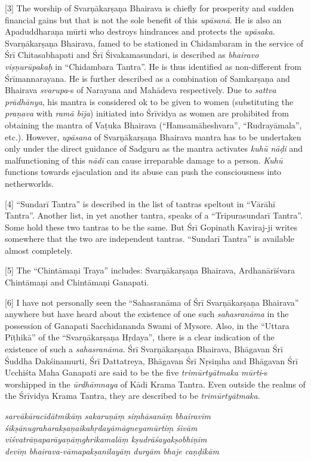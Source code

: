 \documentclass[11pt,oneside,a4paper]{article}
\newenvironment{shloka}[1]
  {\bigskip\center#1\varwidth{\linewidth}}
  {\endvarwidth\endcenter\bigskip}
\newcommand{\tl}[1]{\emph{#1}}
\begin{document}
[3] The worship of Svarṇākarṣaṇa Bhairava is chiefly for prosperity and sudden
financial gains but that is not the sole benefit of this \tl{upāsanā}. He is
also an Apaduddharaṇa mūrti who destroys hindrances and protects the \tl{upāsaka}.
Svarṇākarṣaṇa Bhairava, famed to be stationed in Chidambaram in the service
of Śrī Chitasabhapati and Śrī Śivakamasundari, is described as \tl{bhairavo
viṣṇurūpakaḥ} in ``Chidambara Tantra''. He is thus identified as non-different
from Śrīmannarayana. He is further described as a combination of Samkarṣaṇa
and Bhairava \tl{svarupa}-s of Narayana and Mahādeva respectively. Due to
\tl{sattva prādhānya}, his mantra is considered ok to be given to women
(substituting the \tl{praṇava} with \tl{ramā bīja}) initiated into Śrīvidya
as women are prohibited from obtaining the mantra of Vaṭuka Bhairava
(``Hamsamāheshvara'', ``Rudrayāmala'', etc.). However, \tl{upāsana} of
Svarṇākarṣaṇa Bhairava mantra has to be undertaken only under the direct
guidance of Sadguru as the mantra activates \tl{kuhū nāḍi} and malfunctioning
of this \tl{nādī} can cause irreparable damage to a person. \tl{Kuhū} functions
towards ejaculation and its abuse can push the consciousness into netherworlds.

[4] ``Sundarī Tantra'' is described in the list of tantras speltout in ``Vārāhī
Tantra''. Another list, in yet another tantra, speaks of a ``Tripurasundarī
Tantra''. Some hold these two tantras to be the same. But Śrī Gopinath
Kaviraj-ji writes somewhere that the two are independent tantras. ``Sundarī
Tantra'' is available almost completely.

[5] The ``Chintāmaṇi Traya'' includes: Svarṇākarṣaṇa Bhairava, Ardhanārīśvara
Chintāmaṇi and Chintāmaṇi Ganapati.

[6] I have not personally seen the ``Sahasranāma of Śrī Svarṇākarṣaṇa Bhairava''
anywhere but have heard about the existence of one such \tl{sahasranāma} in
the possession of Ganapati Sacchidananda Swami of Mysore. Also, in the ``Uttara
Pīṭhikā'' of the ``Svarṇākarṣaṇa Hṛdaya'', there is a clear indication of
the existence of such a \tl{sahasranāma}. Śrī Svarṇākarṣaṇa Bhairava, Bhāgavan
Śrī Śuddha Dakśinamurti, Śrī Dattatreya, Bhāgavan Śrī Nṛsiṃha and Bhāgavan
Śrī Ucchiśta Maha Ganapati are said to be the five \tl{trimūrtyātmaka mūrti}-s
worshipped in the \tl{ūrdhāmnaya} of Kādi Krama Tantra. Even outside the realms
of the Śrīvidya Krama Tantra, they are described to be \tl{trimūrtyātmaka}.

\begin{shloka}\itshape
  sarvākāracidātmikāṃ sakaruṇāṃ siṃhāsanāṃ bhairavīm \\
  śikṣānugraharakṣaṇaikahṛdayāmāgneyamūrtiṃ śivām \\
  viśvatrāṇaparāyaṇāṃghrikamalāṃ kṣudrāśayakṣobhiṇīm \\
  devīṃ bhairava-vāmapakṣanilayāṃ durgām bhaje caṇḍikām
\end{shloka}
\end{document}
